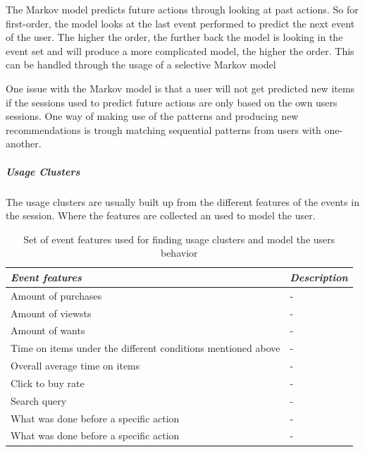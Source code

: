             The Markov model predicts future actions through looking at past actions.
            So for first-order, the model looks at the last event performed to predict the next event of the user.
            The higher the order, the further back the model is looking in the event set and will produce a more complicated model, the higher the order.
            This can be handled through the usage of a selective Markov model~\cite{Deshpande:2004:SMM:990301.990304}

            One issue with the Markov model is that a user will not get predicted new items if the sessions used to predict future actions are only based on the own users sessions.
            One way of making use of the patterns and producing new recommendations is trough matching sequential patterns from users with one-another. 


        \subparagraph{Usage Clusters} %
        \label{subp:usage_clusters}
            The usage clusters are usually built up from the different features of the events in the session.
            Where the features are collected an used to model the user.

            \begin{table}[H]
                \centering
                \begin{tabular}{l|l}
                    \emph{Event features} & \emph{Description} \\ \hline
                    Amount of purchases & - \\ \hline
                    Amount of viewsts & - \\ \hline
                    Amount of wants & - \\ \hline
                    Time on items under the different conditions mentioned above & -\\ \hline
                    Overall average time on items & - \\ \hline
                    Click to buy rate & - \\ \hline
                    Search query~\cite{Zhang:2006:MSE:1135777.1136004} & - \\ \hline
                    What was done before a specific action & - \\ \hline
                    What was done before a specific action & - \\
                \end{tabular}
                \caption[Event Features]{Set of event features used for finding usage clusters and model the users behavior}
                \label{table:evaluationcoldstart}
            \end{table}

